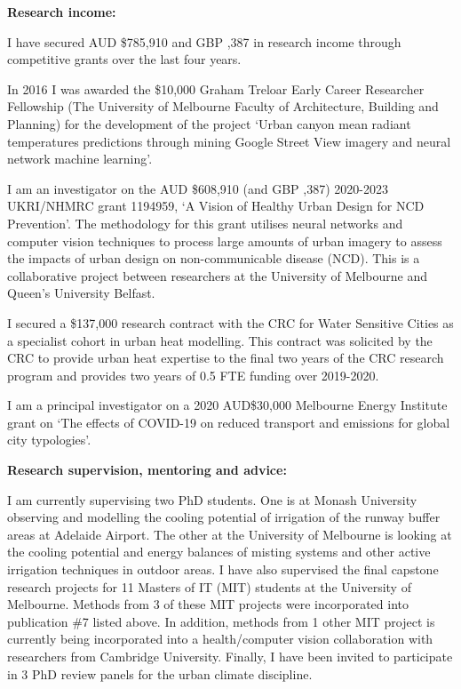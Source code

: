 \textbf{Research income:}

I have secured AUD \$785,910 and GBP ,387 in research income through competitive grants over the last four years.

In 2016 I was awarded the \$10,000 Graham Treloar Early Career Researcher Fellowship (The University of Melbourne Faculty of Architecture, Building and Planning) for the development of the project `Urban canyon mean radiant temperatures predictions through mining Google Street View imagery and neural network machine learning'.

I am an investigator on the AUD \$608,910 (and GBP ,387) 2020-2023 UKRI/NHMRC grant 1194959, `A Vision of Healthy Urban Design for NCD Prevention'. The methodology for this grant utilises neural networks and computer vision techniques to process large amounts of urban imagery to assess the impacts of urban design on non-communicable disease (NCD). This is a collaborative project between researchers at the University of Melbourne and Queen's University Belfast.

I secured a \$137,000 research contract with the CRC for Water Sensitive Cities as a specialist cohort in urban heat modelling. This contract was solicited by the CRC to provide urban heat expertise to the final two years of the CRC research program and provides two years of 0.5 FTE funding over 2019-2020.

I am a principal investigator on a 2020 AUD\$30,000 Melbourne Energy Institute grant on `The effects of COVID-19 on reduced transport and emissions for global city typologies'. 

\textbf{Research supervision, mentoring and advice:}

I am currently supervising two PhD students. One is at Monash University observing and modelling the cooling potential of irrigation of the runway buffer areas at Adelaide Airport. The other at the University of Melbourne is looking at the cooling potential and energy balances of misting systems and other active irrigation techniques in outdoor areas. I have also supervised the final capstone research projects for 11 Masters of IT (MIT) students at the University of Melbourne. Methods from 3 of these MIT projects were incorporated into publication \#7 listed above. In addition, methods from 1 other MIT project is currently being incorporated into a health/computer vision collaboration with researchers from Cambridge University. Finally, I have been invited to participate in 3 PhD review panels for the urban climate discipline.



